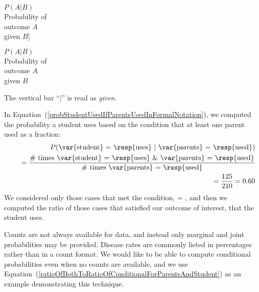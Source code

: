 $P(A | B)$\vspace{1mm}\\\footnotesize Probability of\\outcome $A$\\given $B$]{\raggedright\vspace{-10mm}

$P(A | B)$\vspace{1mm}\\\footnotesize Probability of\\outcome $A$\\given $B$}The vertical bar ``$|$'' is read as \emph{given}.

In Equation~(\ref{probStudentUsedIfParentsUsedInFormalNotation}), we computed the probability a student uses based on the condition that at least one parent used as a fraction:
\begin{eqnarray}
&& P(\text{\var{student} = \resp{uses} } | \text{ \var{parents} = \resp{used}}) \notag \\
&&\quad = \frac{\text{\# times \var{student} = \resp{uses} \& \var{parents} = \resp{used}}}{\text{\# times \var{parents} = \resp{used}}} \label{ratioOfBothToRatioOfConditionalForParentsAndStudent} \\
&&\quad = \frac{125}{210} = 0.60 \notag
\end{eqnarray}
We considered only those cases that met the condition,  = , and then we computed the ratio of those cases that satisfied our outcome of interest, that the student uses.

Counts are not always available for data, and instead only marginal and joint probabilities may be provided. Disease rates are commonly listed in percentages rather than in a count format. We would like to be able to compute conditional probabilities even when no counts are available, and we use Equation~(\ref{ratioOfBothToRatioOfConditionalForParentsAndStudent}) as an example demonstrating this technique.

